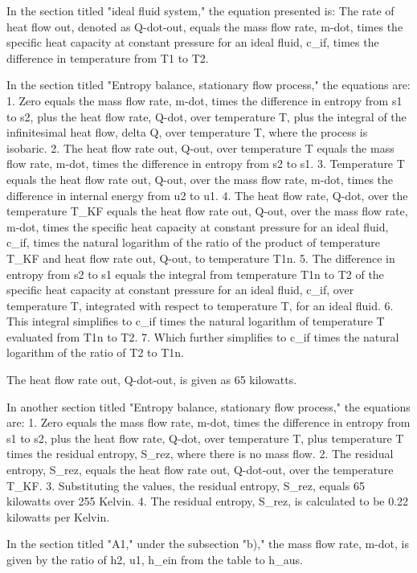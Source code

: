 In the section titled "ideal fluid system," the equation presented is:
The rate of heat flow out, denoted as Q-dot-out, equals the mass flow rate, m-dot, times the specific heat capacity at constant pressure for an ideal fluid, c_if, times the difference in temperature from T1 to T2.

In the section titled "Entropy balance, stationary flow process," the equations are:
1. Zero equals the mass flow rate, m-dot, times the difference in entropy from s1 to s2, plus the heat flow rate, Q-dot, over temperature T, plus the integral of the infinitesimal heat flow, delta Q, over temperature T, where the process is isobaric.
2. The heat flow rate out, Q-out, over temperature T equals the mass flow rate, m-dot, times the difference in entropy from s2 to s1.
3. Temperature T equals the heat flow rate out, Q-out, over the mass flow rate, m-dot, times the difference in internal energy from u2 to u1.
4. The heat flow rate, Q-dot, over the temperature T_KF equals the heat flow rate out, Q-out, over the mass flow rate, m-dot, times the specific heat capacity at constant pressure for an ideal fluid, c_if, times the natural logarithm of the ratio of the product of temperature T_KF and heat flow rate out, Q-out, to temperature T1n.
5. The difference in entropy from s2 to s1 equals the integral from temperature T1n to T2 of the specific heat capacity at constant pressure for an ideal fluid, c_if, over temperature T, integrated with respect to temperature T, for an ideal fluid.
6. This integral simplifies to c_if times the natural logarithm of temperature T evaluated from T1n to T2.
7. Which further simplifies to c_if times the natural logarithm of the ratio of T2 to T1n.

The heat flow rate out, Q-dot-out, is given as 65 kilowatts.

In another section titled "Entropy balance, stationary flow process," the equations are:
1. Zero equals the mass flow rate, m-dot, times the difference in entropy from s1 to s2, plus the heat flow rate, Q-dot, over temperature T, plus temperature T times the residual entropy, S_rez, where there is no mass flow.
2. The residual entropy, S_rez, equals the heat flow rate out, Q-dot-out, over the temperature T_KF.
3. Substituting the values, the residual entropy, S_rez, equals 65 kilowatts over 255 Kelvin.
4. The residual entropy, S_rez, is calculated to be 0.22 kilowatts per Kelvin.

In the section titled "A1," under the subsection "b)," the mass flow rate, m-dot, is given by the ratio of h2, u1, h_ein from the table to h_aus.